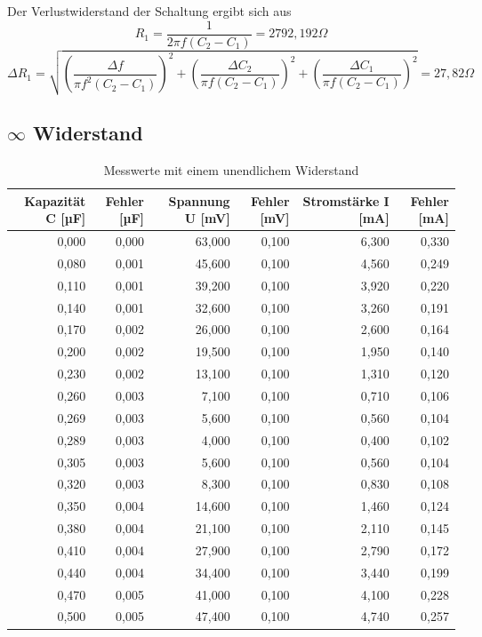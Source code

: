 Der Verlustwiderstand der Schaltung ergibt sich aus
\begin{equation}
R_1= \frac{1}{2\pi f (C_2-C_1)}=2792,192\Omega
\end{equation}
\begin{equation}
\Delta R_1 = \sqrt{ \left( \dfrac{\Delta f}{\pi f^2 (C_2 - C_1)} \right)^2 + \left( \dfrac{\Delta C_2}{\pi f (C_2 - C_1)} \right)^2 + \left( \dfrac{\Delta C_1}{\pi f (C_2 - C_1)} \right)^2}=27,82\Omega
\end{equation}

\newpage
\subsection{$\infty$ Widerstand}

\begin{table}[h]
  \centering
  
    \begin{tabular}{rrrrrr}
    \toprule
    Kapazität C [µF] & Fehler [µF] & Spannung U [mV] & Fehler [mV] & Stromstärke I [mA] & Fehler [mA] \\
    \midrule
    0,000 & 0,000 & 63,000 & 0,100 & 6,300 & 0,330 \\
        0,080 & 0,001 & 45,600 & 0,100 & 4,560 & 0,249 \\
        0,110 & 0,001 & 39,200 & 0,100 & 3,920 & 0,220 \\
        0,140 & 0,001 & 32,600 & 0,100 & 3,260 & 0,191 \\
        0,170 & 0,002 & 26,000 & 0,100 & 2,600 & 0,164 \\
        0,200 & 0,002 & 19,500 & 0,100 & 1,950 & 0,140 \\
        0,230 & 0,002 & 13,100 & 0,100 & 1,310 & 0,120 \\
        0,260 & 0,003 & 7,100 & 0,100 & 0,710 & 0,106 \\
        0,269 & 0,003 & 5,600 & 0,100 & 0,560 & 0,104 \\
        0,289 & 0,003 & 4,000 & 0,100 & 0,400 & 0,102 \\
        0,305 & 0,003 & 5,600 & 0,100 & 0,560 & 0,104 \\
        0,320 & 0,003 & 8,300 & 0,100 & 0,830 & 0,108 \\
        0,350 & 0,004 & 14,600 & 0,100 & 1,460 & 0,124 \\
        0,380 & 0,004 & 21,100 & 0,100 & 2,110 & 0,145 \\
        0,410 & 0,004 & 27,900 & 0,100 & 2,790 & 0,172 \\
        0,440 & 0,004 & 34,400 & 0,100 & 3,440 & 0,199 \\
        0,470 & 0,005 & 41,000 & 0,100 & 4,100 & 0,228 \\
        0,500 & 0,005 & 47,400 & 0,100 & 4,740 & 0,257 \\
        \bottomrule
    
    \end{tabular}
  \label{tab:addlabel}
  \caption{Messwerte mit einem unendlichem Widerstand}
\end{table}


